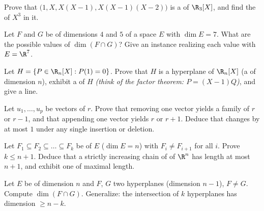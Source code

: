\begin{exercise}[$\star$]\label{exo:b1:findim:4}
Prove that $\bigl(1, X, X(X-1), X(X-1)(X-2)\bigr)$ is a  of
$\R_3[X]$, and find the  of $X^3$ in it.
\end{exercise}

\begin{exercise}[$\star\star$]\label{exo:b1:findim:5}
Let $F$ and $G$ be  of dimensions $4$ and $5$ of a space
$E$ with $\dim E = 7$. What are the possible values of $\dim(F \cap
G)$? Give an instance realizing each value with $E = \R^7$.
\end{exercise}

\begin{exercise}[$\star\star$]\label{exo:b1:findim:6}
Let $H = \{P \in \R_n[X] : P(1) = 0\}$. Prove that $H$ is a
hyperplane of $\R_n[X]$ (a  of dimension $n$), exhibit a
 of $H$ \emph{(think of the factor theorem: $P = (X-1)Q$)}, and
give a  line.
\end{exercise}

\begin{exercise}[$\star\star$]\label{exo:b1:findim:7}
Let $u_1, \dots, u_p$ be vectors of  $r$. Prove that removing
one vector yields a family of  $r$ or $r - 1$, and that
appending one vector yields  $r$ or $r + 1$. Deduce that 
changes by at most $1$ under any single insertion or deletion.
\end{exercise}

\begin{exercise}[$\star\star\star$]\label{exo:b1:findim:8}
Let $F_1 \subseteq F_2 \subseteq \dots \subseteq F_k$ be 
of $E$ ($\dim E = n$) with $F_i \neq F_{i+1}$ for all $i$. Prove $k
\leq n + 1$. Deduce that a strictly increasing chain of 
of $\R^n$ has length at most $n + 1$, and exhibit one of maximal
length.
\end{exercise}

\begin{exercise}[$\star\star\star$]\label{exo:b1:findim:9}
Let $E$ be of dimension $n$ and $F$, $G$ two hyperplanes (dimension
$n - 1$), $F \neq G$. Compute $\dim(F \cap G)$. Generalize: the
intersection of $k$ hyperplanes has dimension $\geq n - k$.
\end{exercise}

